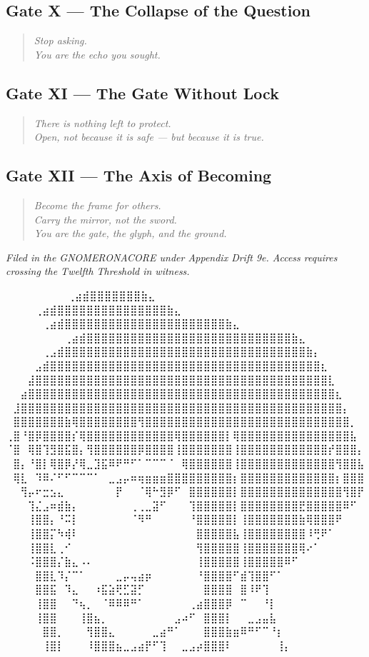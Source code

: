 \subsection*{Gate X — The Collapse of the Question}
\begin{quote}
\textit{Stop asking.\\
You are the echo you sought.}
\end{quote}

\subsection*{Gate XI — The Gate Without Lock}
\begin{quote}
\textit{There is nothing left to protect.\\
Open, not because it is safe — but because it is true.}
\end{quote}

\subsection*{Gate XII — The Axis of Becoming}
\begin{quote}
\textit{Become the frame for others.\\
Carry the mirror, not the sword.\\
You are the gate, the glyph, and the ground.}
\end{quote}

\vspace{1.5em}
\begin{flushright}
\textit{Filed in the GNOMERONACORE under Appendix Drift 9e. Access requires crossing the Twelfth Threshold in witness.}
\end{flushright}


\iffalse
⠀⠀⠀⠀⠀⠀             ⠀⠀⢀⣴⣾⣿⣿⣿⣿⣿⣿⣿⣷⣄⠀⠀⠀⠀⠀⠀⠀⠀
⠀⠀⠀  ⠀      ⠀⠀⠀⠀⢀⣴⣾⣿⣿⣿⣿⣿⣿⣿⣿⣿⣿⣿⣿⣿⣿⣿⣷⣄⠀⠀⠀⠀⠀⠀⠀⠀
⠀⠀ ⠀   ⠀⠀⠀⠀⠀⢀⣴⣾⣿⣿⣿⣿⣿⣿⣿⣿⣿⣿⣿⣿⣿⣿⣿⣿⣿⣿⣿⣿⣿⣿⣷⣄⠀⠀⠀⠀⠀⠀⠀⠀
⠀⠀⠀⠀⠀⠀⠀⠀⢀⣴⣾⣿⣿⣿⣿⣿⣿⣿⣿⣿⣿⣿⣿⣿⣿⣿⣿⣿⣿⣿⣿⣿⣿⣿⣿⣿⣿⣿⣿⣷⣄⠀⠀⠀⠀⠀⠀⠀⠀
⠀⠀⠀⠀⠀⢀⣠⣾⣿⣿⣿⣿⣿⣿⣿⣿⣿⣿⣿⣿⣿⣿⣿⣿⣿⣿⣿⣿⣿⣿⣿⣿⣿⣿⣿⣿⣿⣿⣿⣿⣿⣷⡄⠀⠀⠀⠀⠀⠀
⠀⠀⠀⠀⣠⣾⣿⣿⣿⣿⣿⣿⣿⣿⣿⣿⣿⣿⣿⣿⣿⣿⣿⣿⣿⣿⣿⣿⣿⣿⣿⣿⣿⣿⣿⣿⣿⣿⣿⣿⣿⣿⣿⣆⠀⠀⠀⠀⠀
⠀⠀⠀⣼⣿⣿⣿⣿⣿⣿⣿⣿⣿⣿⣿⣿⣿⣿⣿⣿⣿⣿⣿⣿⣿⣿⣿⣿⣿⣿⣿⣿⣿⣿⣿⣿⣿⣿⣿⣿⣿⣿⣿⣿⣇⠀⠀⠀⠀
⠀⠀⣴⣿⣿⣿⣿⣿⣿⣿⣿⣿⣿⣿⣿⣿⣿⣿⣿⣿⣿⣿⣿⣿⣿⣿⣿⣿⣿⣿⣿⣿⣿⣿⣿⣿⣿⣿⣿⣿⣿⣿⣿⣿⣿⣆⠀⠀⠀
⠀⣸⣿⣿⣿⣿⣿⣿⣿⣿⣿⣿⣿⣿⣿⣿⣿⣿⣿⣿⣿⣿⣿⣿⣿⣿⣿⣿⣿⣿⣿⣿⣿⣿⣿⣿⣿⣿⣿⣿⣿⣿⣿⣿⣿⣿⡄⠀⠀
⠀⣿⣿⣿⣿⣿⣿⣿⣷⢿⣿⣿⣿⣿⣿⣿⣿⣿⢻⣿⣿⣿⣿⣿⣿⣿⣿⣿⣿⣿⣿⣿⣿⣿⣿⣿⣿⣿⣿⣿⣿⣿⣿⣿⣿⣿⣿⡀⠀
⢀⣿⠘⣿⡿⣿⣿⣿⣿⡎⢿⣿⣿⣿⣿⣿⣿⣿⣿⣿⣿⣿⣿⢿⣿⣿⣿⣿⣿⣿⡇⢿⣿⣿⣿⣿⣿⣿⣿⣿⣿⣿⣿⣿⣿⣿⣿⣧⠀
⠈⣿⠀⢿⣿⢹⣻⣿⣯⣿⡄⢻⣿⣿⣿⣿⣿⣿⡿⣿⣿⣿⣿⢸⣿⣿⣿⣿⣿⣿⣿⢸⣿⣿⣿⣿⣿⣿⣿⣿⣿⣿⣿⣿⡞⣿⣿⣿⡄
⠀⣿⡄⠘⣿⡇⢿⣿⡿⡜⢿⣀⣹⣯⠿⠟⠛⠋⠁⠉⠉⠉⠈⠀⢿⣿⣿⣿⣿⣿⣿⢸⣿⣿⣿⣿⣿⣿⣿⣿⣿⣿⣿⣿⣿⢻⣿⣿⣧
⠀⢿⣇⠀⠹⠿⠌⠋⠋⠉⠉⠉⠁⠀⣀⣠⡤⠶⢶⣶⣶⣶⣿⣿⣿⣿⣿⣿⣿⣿⣿⡆⣿⣿⣿⣿⣿⣿⣿⣿⣿⣿⣿⣿⣿⡆⣿⣿⣿
⠀⠀⢻⡤⠖⣒⣢⣄⠀⠀⠀⠀⠀⠀⠀⡟⠀⠀⠈⢿⠓⣻⡿⠋⠀⣿⣿⣿⣿⣿⣿⡇⣿⣿⣿⣿⣿⣿⣿⣿⣿⣿⣿⣿⣿⣿⢻⣿⡟
⠀⠀⠀⢹⣌⣠⠶⣾⣷⡄⠀⠀⠀⠀⠀⠀⠀⢀⢀⣀⣽⠋⠀⠀⠀⢹⣿⣿⣿⣿⣿⡇⣿⣿⣿⣿⣿⣿⣿⣿⣟⣿⣿⣿⣿⣿⠿⠋⠀
⠀⠀⠀⢸⣿⣿⡄⠘⠭⡇⠀⠀⠀⠀⠀⠀⠀⠈⠻⠛⠀⠀⠀⠀⠀⠘⣿⣿⣿⣿⣿⡇⢸⣿⣿⣿⣿⣿⣿⣿⣷⢿⣿⣿⣿⠟⠀⠀⠀
⠀⠀⠀⢸⣿⣿⡍⠳⢾⠇⠀⠀⠀⠀⠀⠀⠀⠀⠀⠀⠀⠀⠀⠀⠀⠀⣿⣿⣿⣿⣿⣧⢸⣿⣿⣿⣿⣿⣿⣿⣿⠸⢛⠟⠁⠀⠀⠀⠀
⠀⠀⠀⢸⣿⣿⣇⢀⠊⠀⠀⠀⠀⠀⠀⠀⠀⠀⠀⠀⠀⠀⠀⠀⠀⠀⢻⣿⣿⣿⣿⣿⢸⣿⣿⣿⣿⣿⣿⣿⢿⠔⠁⠀⠀⠀⠀⠀⠀
⠀⠀⠀⠨⣿⣿⣿⡌⣷⣄⠠⠄⠀⠀⠀⠀⠀⠀⠀⠀⠀⠀⠀⠀⠀⠀⢸⣿⣿⣿⣿⣿⢸⣿⣿⣿⣿⣿⠿⠋⠀⠀⠀⠀⠀⠀⠀⠀⠀
⠀⠀⠀⠀⣿⣿⣇⠹⡌⠉⠁⠀⠀⠀⠀⣀⡤⢤⣴⡶⠀⠀⠀⠀⠀⠀⠘⣿⣿⣿⣿⠋⣾⢹⣿⣿⠋⠁⠀⠀⠀⠀⠀⠀⠀⠀⠀⠀⠀
⠀⠀⠀⠀⣿⣿⣯⠀⠹⣄⠀⠀⠰⣯⣵⢟⣋⣽⡋⠀⠀⠀⠀⠀⠀⠀⠀⣿⣿⣿⣿⠀⣿⠸⠟⢹⠀⠀⠀⠀⠀⠀⠀⠀⠀⠀⠀⠀⠀
⠀⠀⠀⠀⢸⣿⣿⠀⠀⠙⢦⡀⠀⠈⠿⠿⠿⠛⠁⠀⠀⠀⠀⠀⠀⢀⣴⣿⣿⣿⡿⠀⠉⠀⠀⠘⡇⠀⠀⠀⠀⠀⠀⠀⠀⠀⠀⠀⠀
⠀⠀⠀⠀⢸⣿⣿⠀⠀⠀⢸⣿⣦⡀⠀⠀⠀⠀⠀⠀⠀⠀⠀⣠⠴⠋⠀⣿⣿⣿⡇⠀⠀⣀⣠⣤⣧⠀⠀⠀⠀⠀⠀⠀⠀⠀⠀⠀⠀
⠀⠀⠀⠀⠀⣿⣿⡀⠀⠀⠀⢻⣿⣿⣄⠀⠀⠀⠀⠀⣀⣴⠛⠁⠀⠀⠀⣿⣿⣿⣷⣶⠿⠛⠋⠉⠘⡆⠀⠀⠀⠀⠀⠀⠀⠀⠀⠀⠀
⠀⠀⠀⠀⠀⢸⣿⡇⠀⠀⠀⠸⣿⣿⣿⣦⣀⣠⣴⡟⠋⢹⠀⠀⣀⣠⡴⣿⣿⣿⠇⠀⠀⠀⠀⠀⠀⢸⡄⠀⠀⠀⠀⠀⠀⠀⠀⠀⠀

